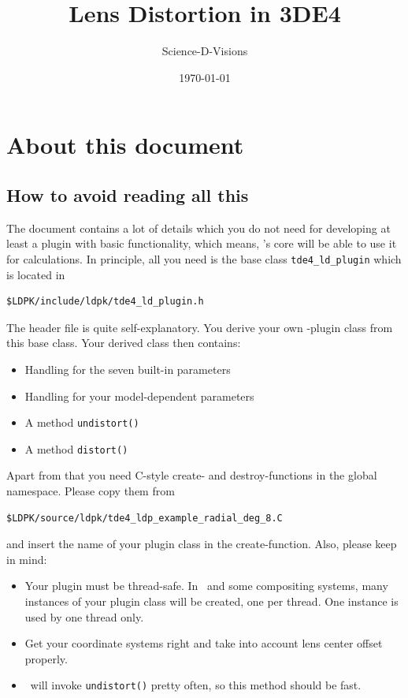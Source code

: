 \documentclass[10pt,a4paper]{article}
\title{Lens Distortion in 3DE4}
\author{Science-D-Visions}
\date{\today}
\begin{document}
\maketitle

\tableofcontents

\setcounter{section}{-1}
\newpage
\section{About this document}
%
\subsection{How to avoid reading all this}
The document contains a lot of details which you do not need
for developing at least a plugin with basic functionality,
which means, \tde's core will be able to use it for calculations.
In principle, all you need is the base class {\tt tde4\_ld\_plugin}
which is located in
\begin{verbatim}
$LDPK/include/ldpk/tde4_ld_plugin.h
\end{verbatim}
The header file is quite self-explanatory. You derive your own \tde-plugin
class from this base class. Your derived class then contains:
\begin{itemize}
\item Handling for the seven built-in parameters
\item Handling for your model-dependent parameters
\item A method {\tt undistort()}
\item A method {\tt distort()}
\end{itemize}
Apart from that you need C-style create- and destroy-functions in the global namespace.
Please copy them from
\begin{verbatim}
$LDPK/source/ldpk/tde4_ldp_example_radial_deg_8.C
\end{verbatim}
and insert the name of your plugin class in the create-function.
Also, please keep in mind:
\begin{itemize}
\item Your plugin must be thread-safe. In \tde\ and some compositing systems,
many instances of your plugin class will be created, one per thread.
One instance is used by one thread only.
\item Get your coordinate systems right and take into account lens center offset properly.
\item \tde\ will invoke {\tt undistort()} pretty often, so this method should be fast.
\end{itemize}
\end{document}
